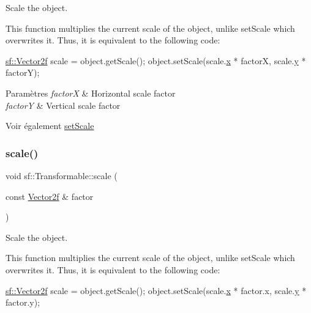 Scale the object. 

This function multiplies the current scale of the object, unlike set\+Scale which overwrites it. Thus, it is equivalent to the following code\+: 
\begin{DoxyCode}
\hyperlink{classsf_1_1Vector2}{sf::Vector2f} scale = \textcolor{keywordtype}{object}.getScale();
\textcolor{keywordtype}{object}.setScale(scale.\hyperlink{classsf_1_1Vector2_a1e6ad77fa155f3753bfb92699bd28141}{x} * factorX, scale.\hyperlink{classsf_1_1Vector2_a420f2481b015f4eb929c75f2af564299}{y} * factorY);
\end{DoxyCode}



\begin{DoxyParams}{Paramètres}
{\em factorX} & Horizontal scale factor \\
\hline
{\em factorY} & Vertical scale factor\\
\hline
\end{DoxyParams}
\begin{DoxySeeAlso}{Voir également}
\hyperlink{classsf_1_1Transformable_aaec50b46b3f41b054763304d1e727471}{set\+Scale} 
\end{DoxySeeAlso}
\mbox{\label{classsf_1_1Transformable_adecaa6c69b1f27dd5194b067d96bb694}} 
\subsubsection{\texorpdfstring{scale()}{scale()}\hspace{0.1cm}{\footnotesize\ttfamily [2/2]}}
{\footnotesize\ttfamily void sf\+::\+Transformable\+::scale (\begin{DoxyParamCaption}\item[{const \hyperlink{classsf_1_1Vector2}{Vector2f} \&}]{factor }\end{DoxyParamCaption})}



Scale the object. 

This function multiplies the current scale of the object, unlike set\+Scale which overwrites it. Thus, it is equivalent to the following code\+: 
\begin{DoxyCode}
\hyperlink{classsf_1_1Vector2}{sf::Vector2f} scale = \textcolor{keywordtype}{object}.getScale();
\textcolor{keywordtype}{object}.setScale(scale.\hyperlink{classsf_1_1Vector2_a1e6ad77fa155f3753bfb92699bd28141}{x} * factor.x, scale.\hyperlink{classsf_1_1Vector2_a420f2481b015f4eb929c75f2af564299}{y} * factor.y);
\end{DoxyCode}



